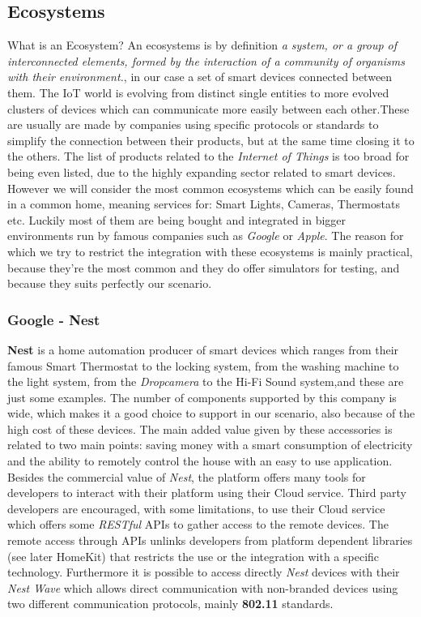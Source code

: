 \subsection{Ecosystems}

What is an Ecosystem? An ecosystems is by definition \textit{a system, or a group of interconnected elements,
formed by the interaction of a community of organisms with their environment.},
in our case a set of smart devices connected between them. The IoT world is evolving
from distinct single entities to more evolved clusters of devices which can communicate
more easily between each other.These are usually are made by companies using specific protocols or standards
to simplify the connection between their products, but at the same time closing it to the others.
The list of products related to the \textit{Internet of Things} is too broad for
being even listed, due to the highly expanding sector related to smart devices.
However we will consider the most common ecosystems which can be easily found in a common
home, meaning services for: Smart Lights, Cameras, Thermostats etc. Luckily
most of them are being bought and integrated in bigger environments run by
famous companies such as \textit{Google} or \textit{Apple}.
The reason for which we try to restrict the integration with these ecosystems is
mainly practical, because they're the most common and they do offer simulators
for testing, and because they suits perfectly our scenario.

\subsubsection{Google - Nest}

\textbf{Nest} is a home automation producer of smart devices
which ranges from their famous Smart Thermostat to the locking system, from the
washing machine to the light system, from the \textit{Dropcamera} to the Hi-Fi Sound system,and
these are just some examples. The number of components supported by this company
is wide, which makes it a good choice to support in our scenario, also because of
the high cost of these devices. The main added value given by these accessories is related
to two main points: saving money with a smart consumption of electricity and the ability
to remotely control the house with an easy to use application.
Besides the commercial value of \textit{Nest}, the platform offers many tools for developers
to interact with their platform using their Cloud service. Third party developers
are encouraged, with some limitations, to use their Cloud service which
offers some \textit{RESTful} APIs to gather access to the remote devices.
The remote access through APIs unlinks developers from platform dependent libraries (see later HomeKit)
that restricts the use or the integration with a specific technology.
Furthermore it is possible to access directly \textit{Nest} devices with their \textit{Nest Wave}
which allows direct communication with non-branded devices using two different communication protocols,
mainly \textbf{802.11} standards.


